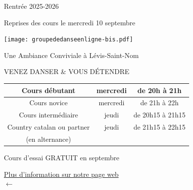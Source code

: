 \documentclass[12pt,a4paper]{article}
\newcommand{\logo}{\makebox[56mm][c]{\rule{0mm}{66mm}\raisebox{12mm}{\texttt{[image: ~/aldc-4couleurs-3.pdf]}}}}
\begin{document}

\vspace*{-20mm}\hspace*{-15mm}



\begin{center}

\bfseries
\color{orange!75!black}

\LARGE

Rentrée 2025-2026

 Reprises des cours le mercredi 10 septembre

\vfill

\texttt{[image: groupededanseenligne-bis.pdf]}

\color{green!50!black}%
Une Ambiance Conviviale à Lévis-Saint-Nom

\color{blue!50!black}%
VENEZ DANSER \& VOUS DÉTENDRE

\vfill

\large
\setlength\arrayrulewidth{2pt}
\color{brown!50!black}
\begin{tabular}{|c|c|c|}
  \hline
  \rowcolor{orange!10}
  Cours débutant & mercredi & de 20h à 21h \\
  \hline
  \rowcolor{orange!20}
  Cours novice & mercredi & de 21h à 22h \\
  \hline
  \rowcolor{orange!30}
  Cours intermédiaire & jeudi & de 20h15 à 21h15 \\
  \hline
  \rowcolor{green!20}%
  \color{green!25!black}%
  Country catalan ou partner & jeudi & de 21h15 à 22h15 \\
  \rowcolor{green!20}%
  \color{green!25!black}%
  (en alternance) &  &  \\
  \hline
\end{tabular}
\vfill

\Large

\color{red!70!black}%
Cours d'essai GRATUIT en septembre

\vfill

\href{https://alevisdanse.github.io}{}
\qquad
\begin{minipage}[c]{0.45\textwidth}
  \Huge\color{black!50!blue}  \href{https://alevisdanse.github.io}{Plus d'information sur notre page web \\
    $\longleftarrow$}
\end{minipage}

\end{center}
\end{document}
